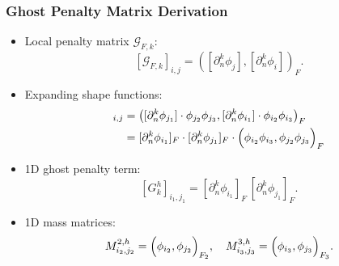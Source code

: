 \documentclass{beamer}
\begin{document}
\begin{frame}
    \frametitle{Ghost Penalty Matrix Derivation}
    \begin{itemize}
        \item Local penalty matrix $\mathcal{G}_{F,k}$:
              \[
                  [\mathcal{G}_{F,k} ]_{i,j} = \left( [\partial_n^k \phi_j], [\partial_n^k \phi_i] \right)_F.
              \]
        \item Expanding shape functions:
              \begin{align*}
                  [\mathcal{G}_{F,k} ]_{i,j} & = \left( [\partial_n^k \phi_{j_1}] \cdot \phi_{j_2}\phi_{j_3},
                  [\partial_n^k \phi_{i_1}] \cdot \phi_{i_2}\phi_{i_3} \right)_F                              \\
                                             & =	[\partial_n^k \phi_{i_1}]_{F} \cdot [\partial_n^k
                      \phi_{j_1}]_{F}	\cdot
                  \Bigl( \phi_{i_2}\phi_{i_3} , \phi_{j_2}\phi_{j_3} \Bigr)_F
              \end{align*}
        \item 1D ghost penalty term:
              \[
                  [G^h_k]_{i_1,j_1} = \left[\partial_n^k \phi_{i_1}\right]_{F} \, \left[\partial_n^k
                      \phi_{j_1}\right]_{F}.
              \]
        \item 1D mass matrices:
              \[
                  M^{2,h }_{i_2,j_2} = \Bigl( \phi_{i_2} , \phi_{j_2} \Bigr)_{F_2}, \quad
                  M^{3,h}_{i_3,j_3} = \Bigl( \phi_{i_3} , \phi_{j_3} \Bigr)_{F_3}.
              \]
    \end{itemize}
\end{frame}
\end{document}
